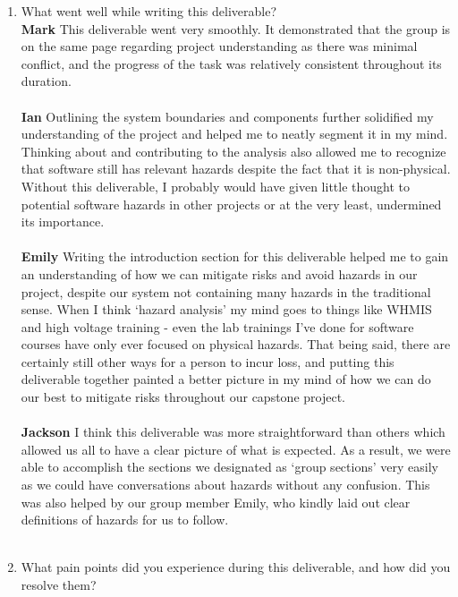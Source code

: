 \documentclass{article}
\begin{document}
\begin{enumerate}
    \item What went well while writing this deliverable? \\
    \textbf{Mark} This deliverable went very smoothly. It demonstrated that the group is on the same page regarding project understanding as there was minimal conflict, and the progress of the task was relatively consistent throughout its duration. \\ \\
    \textbf{Ian} Outlining the system boundaries and components further solidified my 
    understanding of the project and helped me to neatly segment it in my mind. Thinking 
    about and contributing to the analysis also allowed me to recognize that software 
    still has relevant hazards despite the fact that it is non-physical. Without this 
    deliverable, I probably would have given little thought to potential software hazards 
    in other projects or at the very least, undermined its importance.\\ \\
    \textbf{Emily} Writing the introduction section for this deliverable helped me to gain 
    an understanding of how we can mitigate risks and avoid hazards in our project, despite 
    our system not containing many hazards in the traditional sense. When I think ‘hazard 
    analysis’ my mind goes to things like WHMIS and high voltage training - even the lab 
    trainings I’ve done for software courses have only ever focused on physical hazards. 
    That being said, there are certainly still other ways for a person to incur loss, and 
    putting this deliverable together painted a better picture in my mind of how we can do 
    our best to mitigate risks throughout our capstone project. \\ \\
    \textbf{Jackson} I think this deliverable was more straightforward than others which allowed 
    us all to have a clear picture of what is expected. As a result, we were able to accomplish the 
    sections we designated as ‘group sections’ very easily as we could have conversations about hazards 
    without any confusion. This was also helped by our group member Emily, who kindly laid out clear definitions 
    of hazards for us to follow.\\ \\
    \item What pain points did you experience during this deliverable, and how
    did you resolve them? \\

\end{enumerate}
\end{document}
